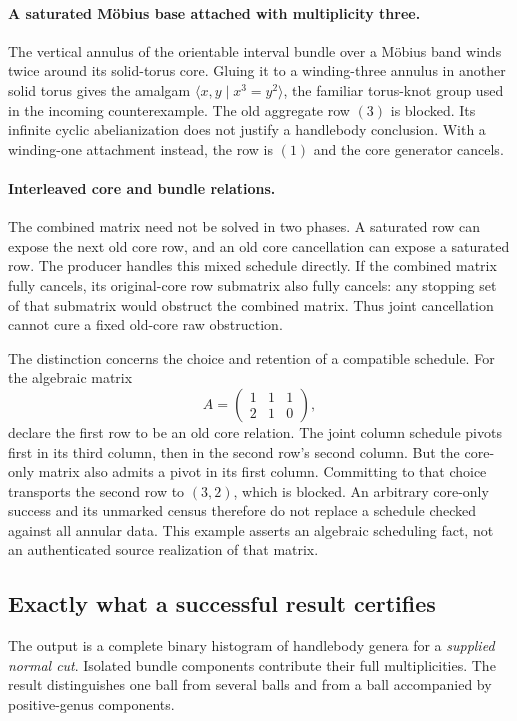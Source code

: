 \paragraph{A saturated M\"obius base attached with multiplicity three.}
The vertical annulus of the orientable interval bundle over a M\"obius
band winds twice around its solid-torus core. Gluing it to a winding-three
annulus in another solid torus gives the amalgam
$\langle x,y\mid x^3=y^2\rangle$, the familiar torus-knot group used in
the incoming counterexample\cite{hierarchy-incoming}. The old aggregate
row $(3)$ is blocked. Its infinite cyclic abelianization does not justify
a handlebody conclusion. With a winding-one attachment instead, the row
is $(1)$ and the core generator cancels.

\paragraph{Interleaved core and bundle relations.}
The combined matrix need not be solved in two phases. A saturated row can
expose the next old core row, and an old core cancellation can expose a
saturated row. The producer handles this mixed schedule directly.
If the combined matrix fully cancels, its original-core row submatrix also
fully cancels: any stopping set of that submatrix would obstruct the
combined matrix. Thus joint cancellation cannot cure a fixed old-core
raw obstruction.

The distinction concerns the choice and retention of a compatible
schedule. For the algebraic matrix
\[
 A=\begin{pmatrix}1&1&1\\2&1&0\end{pmatrix},
\]
declare the first row to be an old core relation. The joint column
schedule pivots first in its third column, then in the second row's
second column. But the core-only matrix also admits a pivot in its
first column. Committing to that choice transports the second row to
$(3,2)$, which is blocked. An arbitrary core-only success and its unmarked
census therefore do not replace a schedule checked against all annular
data. This example asserts an algebraic scheduling fact, not an
authenticated source realization of that matrix.

\subsection{Exactly what a successful result certifies}

The output is a complete binary histogram of handlebody genera for a
\emph{supplied normal cut}. Isolated bundle components contribute their full
multiplicities. The result distinguishes one ball from several balls and
from a ball accompanied by positive-genus components.

